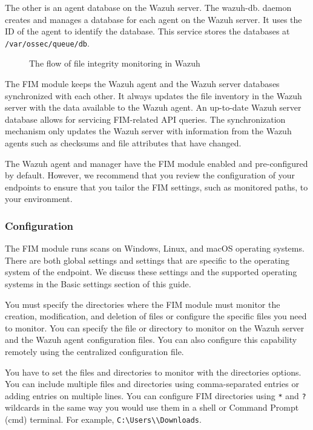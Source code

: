 The other is an agent database on the Wazuh server. The wazuh-db. daemon creates and manages a database for each agent on the Wazuh server. It uses the ID of the agent to identify the database. This service stores the databases at \texttt{/var/ossec/queue/db}.

\begin{figure} [H]
    \centering
    \caption{The flow of file integrity monitoring in Wazuh}
    \label{fig:fim-flow}
\end{figure}

The FIM module keeps the Wazuh agent and the Wazuh server databases synchronized with each other. It always updates the file inventory in the Wazuh server with the data available to the Wazuh agent. An up-to-date Wazuh server database allows for servicing FIM-related API queries. The synchronization mechanism only updates the Wazuh server with information from the Wazuh agents such as checksums and file attributes that have changed.

The Wazuh agent and manager have the FIM module enabled and pre-configured by default. However, we recommend that you review the configuration of your endpoints to ensure that you tailor the FIM settings, such as monitored paths, to your environment.

\subsubsection{Configuration}
The FIM module runs scans on Windows, Linux, and macOS operating systems. There are both global settings and settings that are specific to the operating system of the endpoint. We discuss these settings and the supported operating systems in the Basic settings section of this guide.

You must specify the directories where the FIM module must monitor the creation, modification, and deletion of files or configure the specific files you need to monitor. You can specify the file or directory to monitor on the Wazuh server and the Wazuh agent configuration files. You can also configure this capability remotely using the centralized configuration file.

You have to set the files and directories to monitor with the directories options. You can include multiple files and directories using comma-separated entries or adding entries on multiple lines. You can configure FIM directories using \texttt{*} and \texttt{?} wildcards in the same way you would use them in a shell or Command Prompt (cmd) terminal. For example, \texttt{C:\textbackslash Users\textbackslash *\textbackslash Downloads}.

